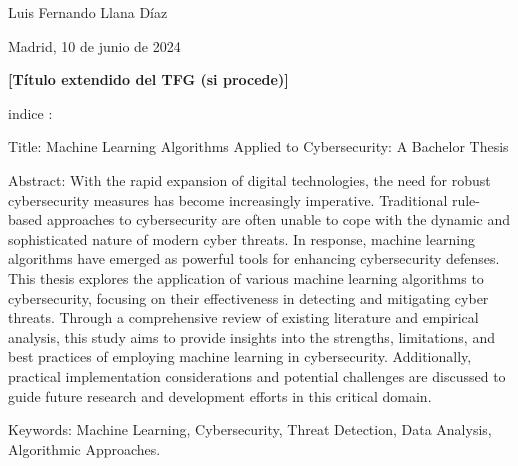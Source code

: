 \documentclass[11pt, a4paper]{article} %
\begin{document}
\begin{titlepage}
    \vfill
    
    
    \begin{minipage}{0.8\textwidth}
        \begin{flushleft}
            {\Large Luis Fernando Llana Díaz}
        \end{flushleft}
    \end{minipage}

    \vfill
    \vfill
    \vfill 

	\begin{minipage}{0.75\textwidth}
    	    \begin{flushright}
    	    		{\Large Madrid, 10 de junio de 2024}  
		\end{flushright}        	           
	\end{minipage}     
     
    
\end{titlepage}



\newpage

{\bfseries \large [Título extendido del TFG (si procede)] }\vspace{10mm} 





\nocite{*}


indice :




Title: Machine Learning Algorithms Applied to Cybersecurity: A Bachelor Thesis

Abstract:
With the rapid expansion of digital technologies, the need for robust cybersecurity measures has become increasingly imperative. Traditional rule-based approaches to cybersecurity are often unable to cope with the dynamic and sophisticated nature of modern cyber threats. In response, machine learning algorithms have emerged as powerful tools for enhancing cybersecurity defenses. This thesis explores the application of various machine learning algorithms to cybersecurity, focusing on their effectiveness in detecting and mitigating cyber threats. Through a comprehensive review of existing literature and empirical analysis, this study aims to provide insights into the strengths, limitations, and best practices of employing machine learning in cybersecurity. Additionally, practical implementation considerations and potential challenges are discussed to guide future research and development efforts in this critical domain.

Keywords: Machine Learning, Cybersecurity, Threat Detection, Data Analysis, Algorithmic Approaches.
\end{document}
